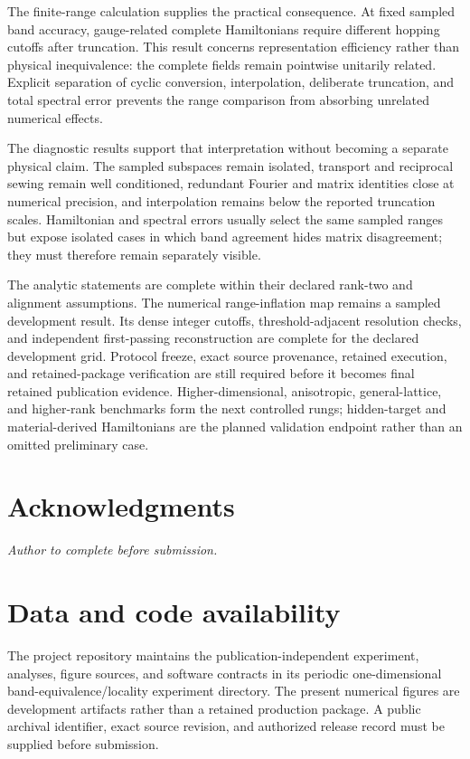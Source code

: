 \documentclass[aps,prb,reprint,amsmath,amssymb,longbibliography,floatfix]{revtex4-2}
\begin{document}
The finite-range calculation supplies the practical consequence. At fixed sampled band
accuracy, gauge-related complete Hamiltonians require different hopping cutoffs after
truncation. This result concerns representation efficiency rather than physical
inequivalence: the complete fields remain pointwise unitarily related. Explicit
separation of cyclic conversion, interpolation, deliberate truncation, and total
spectral error prevents the range comparison from absorbing unrelated numerical effects.

The diagnostic results support that interpretation without becoming a separate physical
claim. The sampled subspaces remain isolated, transport and reciprocal sewing remain
well conditioned, redundant Fourier and matrix identities close at numerical precision,
and interpolation remains below the reported truncation scales. Hamiltonian and spectral
errors usually select the same sampled ranges but expose isolated cases in which band
agreement hides matrix disagreement; they must therefore remain separately visible.

The analytic statements are complete within their declared rank-two and alignment
assumptions. The numerical range-inflation map remains a sampled development result.
Its dense integer cutoffs, threshold-adjacent resolution checks, and independent
first-passing reconstruction are complete for the declared development grid. Protocol
freeze, exact source provenance, retained execution, and retained-package verification
are still required before it becomes final retained publication evidence. Higher-dimensional, anisotropic, general-lattice, and higher-rank benchmarks form the
next controlled rungs; hidden-target and material-derived Hamiltonians are the planned
validation endpoint rather than an omitted preliminary case.

\section*{Acknowledgments}
\emph{Author to complete before submission.}

\section*{Data and code availability}
The project repository maintains the publication-independent experiment, analyses,
figure sources, and software contracts in its periodic one-dimensional
band-equivalence/locality experiment directory. The present numerical figures are
development artifacts rather than a retained production package. A public archival
identifier, exact source revision, and authorized release record must be supplied before
submission.



\end{document}
